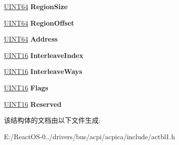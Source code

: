 \begin{DoxyCompactItemize}
\hyperlink{_processor_bind_8h_a57be03562867144161c1bfee95ca8f7c}{U\+I\+N\+T64} {\bfseries Region\+Size}
\item 
\mbox{\label{structacpi__nfit__memory__map_a7a81f6c134b6258d7a83d3a57667e490}} 
\hyperlink{_processor_bind_8h_a57be03562867144161c1bfee95ca8f7c}{U\+I\+N\+T64} {\bfseries Region\+Offset}
\item 
\mbox{\label{structacpi__nfit__memory__map_abd5964ae5431438bdcde59272bd24d2e}} 
\hyperlink{_processor_bind_8h_a57be03562867144161c1bfee95ca8f7c}{U\+I\+N\+T64} {\bfseries Address}
\item 
\mbox{\label{structacpi__nfit__memory__map_a7de3bbe9711a32020df913a24f110055}} 
\hyperlink{_processor_bind_8h_a09f1a1fb2293e33483cc8d44aefb1eb1}{U\+I\+N\+T16} {\bfseries Interleave\+Index}
\item 
\mbox{\label{structacpi__nfit__memory__map_af31760adf43e53908ac006014a93e2ed}} 
\hyperlink{_processor_bind_8h_a09f1a1fb2293e33483cc8d44aefb1eb1}{U\+I\+N\+T16} {\bfseries Interleave\+Ways}
\item 
\mbox{\label{structacpi__nfit__memory__map_ac552c3261bd85ad9a3b7f27dfe2f9efb}} 
\hyperlink{_processor_bind_8h_a09f1a1fb2293e33483cc8d44aefb1eb1}{U\+I\+N\+T16} {\bfseries Flags}
\item 
\mbox{\label{structacpi__nfit__memory__map_ab2d52fbe516bf2fcfd40cd5e7ba66efa}} 
\hyperlink{_processor_bind_8h_a09f1a1fb2293e33483cc8d44aefb1eb1}{U\+I\+N\+T16} {\bfseries Reserved}
\end{DoxyCompactItemize}


该结构体的文档由以下文件生成\+:\begin{DoxyCompactItemize}
\item 
E\+:/\+React\+O\+S-\/0../drivers/bus/acpi/acpica/include/actbl1.\+h\end{DoxyCompactItemize}
